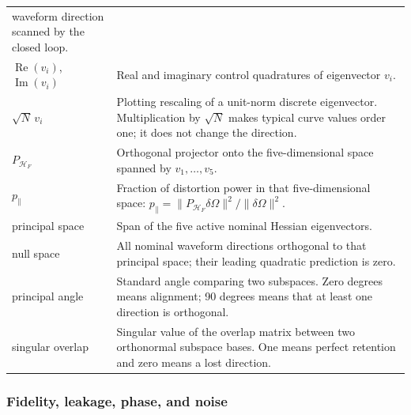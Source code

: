 \documentclass[11pt]{article}
\newcommand{\pPar}{p_{\parallel}}
\newcommand{\dOm}{\delta\Omega}
\newcommand{\Hess}{\mathcal{H}_{F}}
\begin{document}
\begin{longtable}{p{}p{}}
waveform direction scanned by the closed loop.\\
$\operatorname{Re}(v_i)$, $\operatorname{Im}(v_i)$ & Real and imaginary
control quadratures of eigenvector $v_i$.\\
$\sqrt{N}\,v_i$ & Plotting rescaling of a unit-norm discrete eigenvector.
Multiplication by $\sqrt N$ makes typical curve values order one; it does not
change the direction.\\
$P_{\Hess}$ & Orthogonal projector onto the five-dimensional space spanned by
$v_1,\ldots,v_5$.\\
$\pPar$ & Fraction of distortion power in that five-dimensional space:
$\pPar=\|P_{\Hess}\dOm\|^2/\|\dOm\|^2$.\\
principal space & Span of the five active nominal Hessian eigenvectors.\\
null space & All nominal waveform directions orthogonal to that principal
space; their leading quadratic prediction is zero.\\
principal angle & Standard angle comparing two subspaces.  Zero degrees means
alignment; 90 degrees means that at least one direction is orthogonal.\\
singular overlap & Singular value of the overlap matrix between two
orthonormal subspace bases.  One means perfect retention and zero means a
lost direction.\\
\bottomrule
\end{longtable}

\subsubsection{Fidelity, leakage, phase, and noise}
\end{document}

